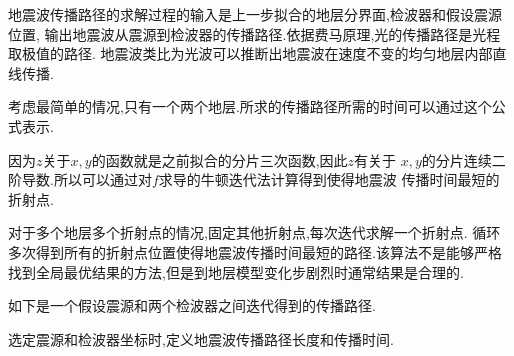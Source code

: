 \documentclass[UTF8]{ctexbeamer}	%
\theoremstyle{plain}
\theoremstyle{definition}
\theoremstyle{remark}
\numberwithin{equation}{section}
\begin{document}
\begin{frame}
    地震波传播路径的求解过程的输入是上一步拟合的地层分界面,检波器和假设震源位置,
    输出地震波从震源到检波器的传播路径.依据费马原理,光的传播路径是光程取极值的路径.
    地震波类比为光波可以推断出地震波在速度不变的均匀地层内部直线传播.

    考虑最简单的情况,只有一个两个地层.所求的传播路径所需的时间可以通过这个公式表示.
\end{frame}

\begin{frame}
    因为$z$关于$x,y$的函数就是之前拟合的分片三次函数,因此$z$有关于
          $x,y$的分片连续二阶导数.所以可以通过对$f$求导的牛顿迭代法计算得到使得地震波
          传播时间最短的折射点.

          对于多个地层多个折射点的情况,固定其他折射点,每次迭代求解一个折射点.
          循环多次得到所有的折射点位置使得地震波传播时间最短的路径.该算法不是能够严格
          找到全局最优结果的方法,但是到地层模型变化步剧烈时通常结果是合理的.

          如下是一个假设震源和两个检波器之间迭代得到的传播路径.
\end{frame}

\begin{frame}
    选定震源和检波器坐标时,定义地震波传播路径长度和传播时间.
    
\end{frame}


\end{document}
